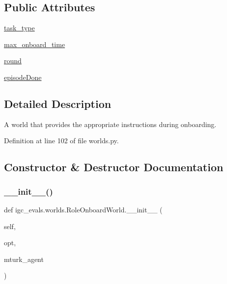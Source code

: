 \subsection*{Public Attributes}
\begin{DoxyCompactItemize}
\item 
\hyperlink{classigc__evals_1_1worlds_1_1RoleOnboardWorld_aa4474e6170fb62445d09455a09377b1c}{task\+\_\+type}
\item 
\hyperlink{classigc__evals_1_1worlds_1_1RoleOnboardWorld_ac1d2cbbaa66cf111ba39cbd112448b99}{max\+\_\+onboard\+\_\+time}
\item 
\hyperlink{classigc__evals_1_1worlds_1_1RoleOnboardWorld_ae6b8b37395e2430f1d533b6fc4cee64e}{round}
\item 
\hyperlink{classigc__evals_1_1worlds_1_1RoleOnboardWorld_a5746dc1a7d35c4a525c8fd2f5f20e149}{episode\+Done}
\end{DoxyCompactItemize}


\subsection{Detailed Description}
\begin{DoxyVerb}A world that provides the appropriate instructions during onboarding.
\end{DoxyVerb}
 

Definition at line 102 of file worlds.\+py.



\subsection{Constructor \& Destructor Documentation}
\mbox{\label{classigc__evals_1_1worlds_1_1RoleOnboardWorld_a7842fc40e237a810c8e281c63b176324}} 
\subsubsection{\texorpdfstring{\+\_\+\+\_\+init\+\_\+\+\_\+()}{\_\_init\_\_()}}
{\footnotesize\ttfamily def igc\+\_\+evals.\+worlds.\+Role\+Onboard\+World.\+\_\+\+\_\+init\+\_\+\+\_\+ (\begin{DoxyParamCaption}\item[{}]{self,  }\item[{}]{opt,  }\item[{}]{mturk\+\_\+agent }\end{DoxyParamCaption})}



